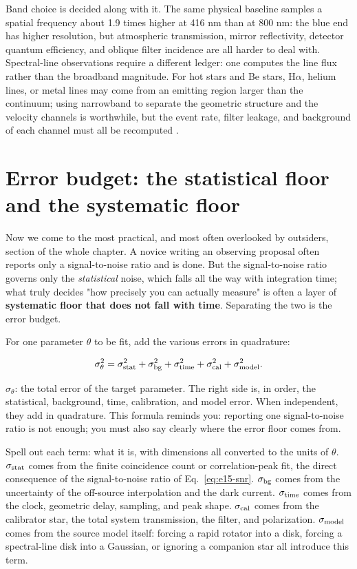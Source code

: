 Band choice is decided along with it. The same physical baseline samples a spatial frequency about 1.9 times higher at 416 nm than at 800 nm: the blue end has higher resolution, but atmospheric transmission, mirror reflectivity, detector quantum efficiency, and oblique filter incidence are all harder to deal with. Spectral-line observations require a different ledger: one computes the line flux rather than the broadband magnitude. For hot stars and Be stars, H$\alpha$, helium lines, or metal lines may come from an emitting region larger than the continuum; using narrowband to separate the geometric structure and the velocity channels is worthwhile, but the event rate, filter leakage, and background of each channel must all be recomputed \citep{2012NewAR..56..143D,2021MNRAS.506.1585Z}.

\section{Error budget: the statistical floor and the systematic floor}
\label{sec:e15-error-budget}

Now we come to the most practical, and most often overlooked by outsiders, section of the whole chapter. A novice writing an observing proposal often reports only a signal-to-noise ratio and is done. But the signal-to-noise ratio governs only the \emph{statistical} noise, which falls all the way with integration time; what truly decides "how precisely you can actually measure" is often a layer of \textbf{systematic floor that does not fall with time}. Separating the two is the error budget.

For one parameter $\theta$ to be fit, add the various errors in quadrature:

\begin{equation}
  \sigma_\theta^2
  = \sigma_{\rm stat}^2
  + \sigma_{\rm bg}^2
  + \sigma_{\rm time}^2
  + \sigma_{\rm cal}^2
  + \sigma_{\rm model}^2 .
  \label{eq:e15-error-budget}
\end{equation}
\begin{formulaexplain}
$\sigma_\theta$: the total error of the target parameter. The right side is, in order, the statistical, background, time, calibration, and model error. When independent, they add in quadrature. This formula reminds you: reporting one signal-to-noise ratio is not enough; you must also say clearly where the error floor comes from.
\end{formulaexplain}

Spell out each term: what it is, with dimensions all converted to the units of $\theta$. $\sigma_{\rm stat}$ comes from the finite coincidence count or correlation-peak fit, the direct consequence of the signal-to-noise ratio of Eq.~\eqref{eq:e15-snr}. $\sigma_{\rm bg}$ comes from the uncertainty of the off-source interpolation and the dark current. $\sigma_{\rm time}$ comes from the clock, geometric delay, sampling, and peak shape. $\sigma_{\rm cal}$ comes from the calibrator star, the total system transmission, the filter, and polarization. $\sigma_{\rm model}$ comes from the source model itself: forcing a rapid rotator into a disk, forcing a spectral-line disk into a Gaussian, or ignoring a companion star all introduce this term.

